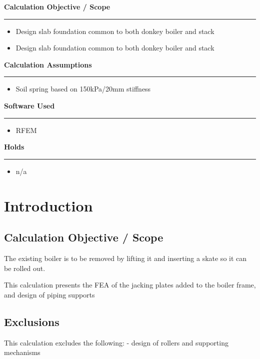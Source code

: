 \documentclass[
  11pt,
  letterpaper,
  DIV=11,
  numbers=noendperiod]{scrartcl}
\author{}
\date{}
\providecommand{\tightlist}{%
  \setlength{\itemsep}{0pt}\setlength{\parskip}{0pt}}
\newcommand{\coverpageHeader}[1]{
    \vspace*{0.5cm}
    \textbf{\fontsize{14pt}{1pt}\selectfont #1} \\
    \noindent\rule{\textwidth}{1pt}
  }
\begin{document}
\coverpageHeader{Calculation Objective / Scope}

\begin{itemize}
\tightlist
\item
  Design slab foundation common to both donkey boiler and stack
\item
  Design slab foundation common to both donkey boiler and stack
\end{itemize}

\coverpageHeader{Calculation Assumptions} 

\begin{itemize}
\tightlist
\item
  Soil spring based on 150kPa/20mm stiffness
\end{itemize}

\coverpageHeader{Software Used} 

\begin{itemize}
\tightlist
\item
  RFEM
\end{itemize}

\coverpageHeader{Holds} 

\begin{itemize}
\tightlist
\item
  n/a
\end{itemize}

\newpage{}

\tableofcontents

\newpage{}

\section{Introduction}\label{sec-intro}

\subsection{Calculation Objective /
Scope}\label{calculation-objective-scope}

The existing boiler is to be removed by lifting it and inserting a skate
so it can be rolled out.

This calculation presents the FEA of the jacking plates added to the
boiler frame, and design of piping supports

\subsection{Exclusions}\label{exclusions}

This calculation excludes the following: - design of rollers and
supporting mechanisms
\end{document}
